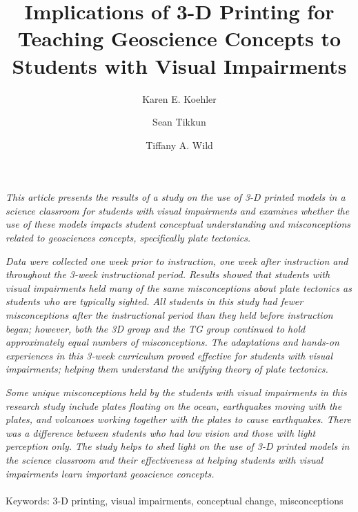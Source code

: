 \documentclass[11.5pt]{sig-alternate} %
\makeatletter
\let\oldabstract\abstract
\let\oldendabstract\endabstract
\renewenvironment{abstract} %
{\renewenvironment{quotation}%
               {\list{}{\addtolength{\leftmargin}{1em} %
                        \listparindent 1.5em%
                        \itemindent    \listparindent%
                        \rightmargin   \leftmargin%
                        \parsep        \z@ \@plus\p@}%
                \item\relax}%
               {\endlist}%
\oldabstract}
{\oldendabstract}
\makeatother
\begin{document}
\title{Implications of 3-D Printing for Teaching Geoscience Concepts to Students with Visual Impairments}

\author[1]{\large \color{blue}Karen E. Koehler}
\author[1]{\large \color{blue}Sean Tikkun}
\author[1]{\large \color{blue}Tiffany A. Wild}


\toappear{}
\maketitle
\begin{@twocolumnfalse} 
\begin{abstract}
\item 
\textit{This article presents the results of a study on the use of 3-D printed models in a science classroom for students with visual impairments and examines whether the use of these models impacts student conceptual understanding and misconceptions related to geosciences concepts, specifically plate tectonics.}

\textit{Data were collected one week prior to instruction, one week after instruction and throughout the 3-week instructional period. Results showed that students with visual impairments held many of the same misconceptions about plate tectonics as students who are typically sighted. All students in this study had fewer misconceptions after the instructional period than they held before instruction began; however, both the 3D group and the TG group continued to hold approximately equal numbers of misconceptions. The adaptations and hands-on experiences in this 3-week curriculum proved effective for students with visual impairments; helping them understand the unifying theory of plate tectonics.} 

\textit{Some unique misconceptions held by the students with visual impairments in this research study include plates floating on the ocean, earthquakes moving with the plates, and volcanoes working together with the plates to cause earthquakes. There was a difference between students who had low vision and those with light perception only. The study helps to shed light on the use of 3-D printed models in the science classroom and their effectiveness at helping students with visual impairments learn important geoscience concepts.}
\\ \\
Keywords: 3-D printing, visual impairments, conceptual change, misconceptions
\end{abstract}
\end{@twocolumnfalse}
\end{document}
